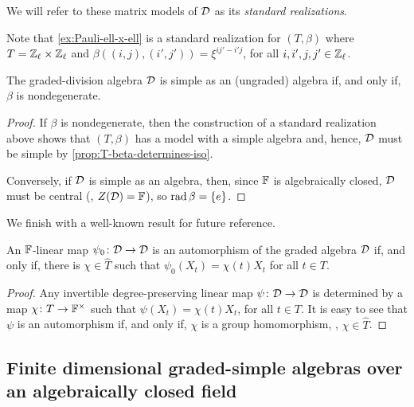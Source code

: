\begin{defi}\label{def:standard-realization}
	We will refer to these matrix models of $\mathcal D$ as its \emph{standard realizations}.
\end{defi}

Note that \cref{ex:Pauli-ell-x-ell} is a standard realization for $(T, \beta)$ where $T = \mathbb{Z}_\ell \times \mathbb{Z}_\ell$ and $\beta ((i, j), (i', j')) = \xi^{ij' - i'j}$, for all $i, i', j, j' \in \mathbb{Z}_\ell$.

\begin{cor}\label{cor:D-simple-iff-beta-nondeg}
    The graded-division algebra $\mathcal{D}$ is simple as an (ungraded) algebra if, and only if, $\beta$ is nondegenerate. 
\end{cor}

\begin{proof}
    If $\beta$ is nondegenerate, then the construction of a standard realization above shows that $(T, \beta)$ has a model with a simple algebra and, hence, $\mathcal{D}$ must be simple by \cref{prop:T-beta-determines-iso}. 
    
    Conversely, if $\mathcal{D}$ is simple as an algebra, then, since $\mathbb{F}$ is algebraically closed, $\mathcal{D}$ must be central (\ie, $Z(\mathcal{D}) = \mathbb{F}$), so $\operatorname{rad} \beta = \{e\}$.
\end{proof}

We finish with a well-known result for future reference.

\begin{lemma}\label{lemma:Aut(D)-widehat-T}
    An $\mathbb{F}$-linear map $\psi_0\colon \mathcal{D} \to \mathcal{D}$ is an automorphism of the graded algebra $\mathcal{D}$ if, and only if, there is $\chi \in \widehat T$ such that $\psi_0( X_t ) = \chi(t) X_t$ for all $t\in T$. 
\end{lemma}

\begin{proof}
    Any invertible degree-preserving linear map $\psi\colon \mathcal{D} \to \mathcal{D}$ is determined by a map $\chi\colon T \to \mathbb{F}^\times$ such that $\psi(X_t) = \chi(t) X_t$, for all $t\in T$. 
    It is easy to see that $\psi$ is an automorphism if, and only if, $\chi$ is a group homomorphism, \ie, $\chi \in \widehat T$. 
\end{proof}

\subsection{Finite dimensional graded-simple algebras over an algebraically closed field}\label{ssec:param-End_D-U}

